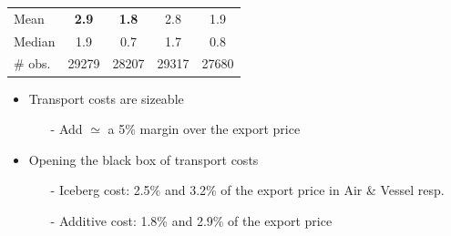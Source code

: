 \documentclass[10 pt,Helvetica, french]{beamer}
\begin{document}
\begin{frame}[label=slide_results_summary]
\begin{table}[htbp]
{\begin{center}
\begin{tabular}{l|cc|cc}
    Mean  & \bf{2.9} & \bf{1.8} & 2.8 & 1.9 \\
    Median & 1.9 & 0.7 & 1.7 & 0.8 \\ \hline
        \# obs. & 29279 & 28207 & 29317 & 27680 \\ \hline \hline
  \end{tabular}
\end{center}}
  \end{table}%
\begin{itemize}
\item Transport costs are sizeable \vspace{0.1cm}
\begin{itemize}
\item[-] Add $\simeq$ a 5\% margin over the export price \vspace{0.1cm}
\end{itemize}
\item Opening the black box of transport costs \vspace{0.1cm}
\begin{itemize}
\item[-] Iceberg cost: 2.5\% and 3.2\% of the export price in Air \& Vessel resp. 
\item[-] Additive cost: 1.8\% and 2.9\% of the export price 
\end{itemize}
\end{itemize}
\end{frame}
\end{document}
